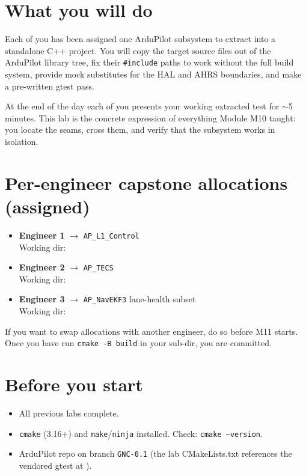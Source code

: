 \documentclass[a4paper,11pt,twoside]{article}
\begin{document}
\section*{What you will do}

Each of you has been assigned one ArduPilot subsystem to extract into a standalone C++ project. You will copy the target source files out of the ArduPilot library tree, fix their \texttt{\#include} paths to work without the full build system, provide mock substitutes for the HAL and AHRS boundaries, and make a pre-written gtest pass.

At the end of the day each of you presents your working extracted test for $\sim$5 minutes. This lab is the concrete expression of everything Module M10 taught: you locate the seams, cross them, and verify that the subsystem works in isolation.

\section*{Per-engineer capstone allocations (assigned)}

\begin{itemize}
  \item \textbf{Engineer 1} $\rightarrow$ \texttt{AP\_L1\_Control}\\ Working dir: 
  \item \textbf{Engineer 2} $\rightarrow$ \texttt{AP\_TECS}\\ Working dir: 
  \item \textbf{Engineer 3} $\rightarrow$ \texttt{AP\_NavEKF3} lane-health subset\\ Working dir: 
\end{itemize}

If you want to swap allocations with another engineer, do so before M11 starts. Once you have run \texttt{cmake -B build} in your sub-dir, you are committed.

\section*{Before you start}

\begin{itemize}
  \item All previous labs complete.
  \item \texttt{cmake} (3.16+) and \texttt{make}/\texttt{ninja} installed. Check: \texttt{cmake --version}.
  \item ArduPilot repo on branch \texttt{GNC-0.1} (the lab CMakeLists.txt references the vendored gtest at ).
\end{itemize}
\end{document}
